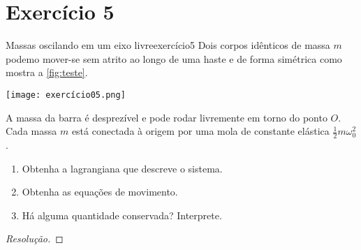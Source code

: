 \section*{Exercício 5}
\begin{exercício}{Massas oscilando em um eixo livre}{exercício5}
    Dois corpos idênticos de massa \(m\) podemo mover-se sem atrito ao longo de uma haste e de forma simétrica como mostra a \cref{fig:teste}.
    \begin{center}
        \texttt{[image: exercício05.png]}
        \label{fig:teste}
    \end{center}
    A massa da barra é desprezível e pode rodar livremente em torno do ponto \(O\). Cada massa \(m\) está conectada à origem por uma mola de constante elástica \(\frac12m\omega_0^2\).
    \begin{enumerate}[label=(\alph*)]
        \item Obtenha a lagrangiana que descreve o sistema.
        \item Obtenha as equações de movimento.
        \item Há alguma quantidade conservada? Interprete.
    \end{enumerate}
\end{exercício}
\begin{proof}[Resolução]

\end{proof}
